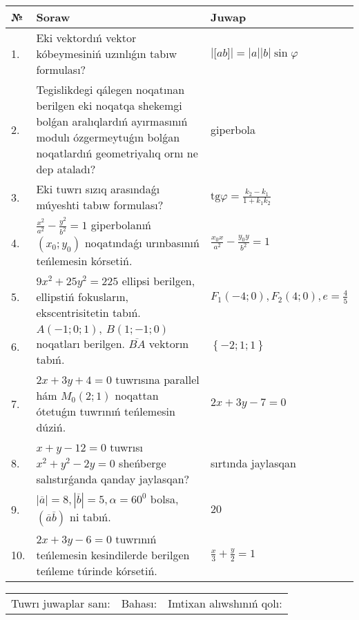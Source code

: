\documentclass{article}
\begin{document}
\begin{tabular}{|m{0.7cm}|m{10cm}|m{4cm}|}
\hline
№ & Soraw & Juwap \\
\hline
1. & Eki vektordıń vektor kóbeymesiniń uzınlıǵın tabıw formulası? & $\left| \lbrack ab\rbrack \right|=|a||b|\sin\varphi$ \\
\hline
2. & Tegislikdegi qálegen noqatınan berilgen eki noqatqa shekemgi bolǵan aralıqlardıń ayırmasınıń modulı ózgermeytuǵın bolǵan noqatlardıń geometriyalıq ornı ne dep ataladı? & giperbola \\
\hline
3. & Eki tuwrı sızıq arasındaǵı múyeshti tabıw formulası? & $\text{tg}\varphi=\frac{k_2-k_1}{1+k_1k_2}$ \\
\hline
4. & $\frac{x^2}{a^2}-\frac{y^2}{b^2}=1$ giperbolanıń $(x_0;y_0)$ noqatındaǵı urınbasınıń teńlemesin kórsetiń. & $\frac{x_0x}{a^2}-\frac{y_0y}{b^2}=1$ \\
\hline
5. & $9x^{2}+25y^{2}=225$ ellipsi berilgen, ellipstiń fokusların, ekscentrisitetin tabıń. & $F_1\left(-4;0 \right) , F_2\left( 4;0 \right) , e = \frac{4}{5}$ \\
\hline
6. & $A (-1;0;1),\ B (1;-1;0)$ noqatları berilgen. $\overline{BA}$ vektorın tabıń. & $\left\{ - 2;1;1 \right\}$ \\
\hline
7. & $2x+3y+4=0$ tuwrısına parallel hám $M_{0} (2;1)$ noqattan ótetuǵın tuwrınıń teńlemesin dúziń. & $2x+3y-7=0$ \\
\hline
8. & $x+y-12=0$ tuwrısı $x^{2}+y^{2}-2y=0$ sheńberge salıstırǵanda qanday jaylasqan? & sırtında jaylasqan \\
\hline
9. & $\left| \overline{a} \right|=8, \left| \overline{b} \right|=5, \alpha=60^{0}$ bolsa, $( \overline{a}\overline{b} )$ ni tabıń. & $20$ \\
\hline
10. & $2x+3y-6=0$ tuwrınıń teńlemesin kesindilerde berilgen teńleme túrinde kórsetiń. & $\frac{x}{3} + \frac{ y }{ 2 } =  1$ \\
\hline
\end{tabular}

\vspace{1cm}

\begin{tabular}{lll}
Tuwrı juwaplar sanı: \underline{\hspace{1.5cm}} & 
Bahası: \underline{\hspace{1.5cm}} & 
Imtixan alıwshınıń qolı: \underline{\hspace{2cm}} \\
\end{tabular}
\end{document}
